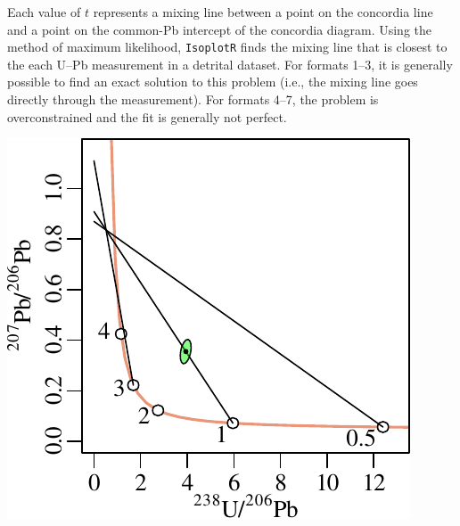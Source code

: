 \begin{refsection}
\begin{enumerate}
\begin{enumerate}
    Each value of $t$ represents a mixing line between a point on the
    concordia line and a point on the common-Pb intercept of the
    concordia diagram. Using the method of maximum likelihood,
    \texttt{IsoplotR} finds the mixing line that is closest to the
    each U--Pb measurement in a detrital dataset. For formats 1--3, it
    is generally possible to find an exact solution to this problem
    (i.e., the mixing line goes directly through the measurement).
    For formats 4--7, the problem is overconstrained and the fit is
    generally not perfect.

    \noindent\begin{minipage}[t][][b]{.4\linewidth}
    \includegraphics[width=\textwidth]{../figures/SK.pdf}
    \end{minipage}
    \begin{minipage}[t][][t]{.6\linewidth}
    \label{fig:commonPbSK}
    \end{minipage}
    

\end{enumerate}
\end{enumerate}
\end{refsection}
